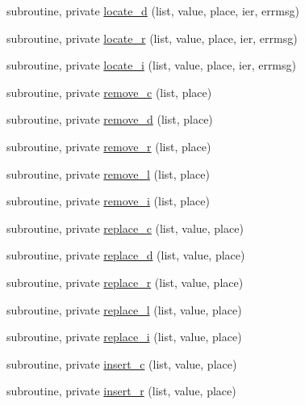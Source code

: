 \begin{DoxyCompactItemize}
\item 
subroutine, private \mbox{\hyperlink{namespacem__cli_a4187c24a2abf5cc630232965637493e8}{locate\+\_\+d}} (list, value, place, ier, errmsg)
\item 
subroutine, private \mbox{\hyperlink{namespacem__cli_ac44389e115b536069f324bffea7d2469}{locate\+\_\+r}} (list, value, place, ier, errmsg)
\item 
subroutine, private \mbox{\hyperlink{namespacem__cli_a36665ab0ea5080c14c8c9e52ed07d397}{locate\+\_\+i}} (list, value, place, ier, errmsg)
\item 
subroutine, private \mbox{\hyperlink{namespacem__cli_a05f549b10f50798d68003b8fd2a2d86a}{remove\+\_\+c}} (list, place)
\item 
subroutine, private \mbox{\hyperlink{namespacem__cli_abf22cbc2af66482f33b7bb1a210d9d99}{remove\+\_\+d}} (list, place)
\item 
subroutine, private \mbox{\hyperlink{namespacem__cli_a4f47701695b95c88fa4927c04996ce0f}{remove\+\_\+r}} (list, place)
\item 
subroutine, private \mbox{\hyperlink{namespacem__cli_a9c86f0f52ce71f14e774fd21f0686cf6}{remove\+\_\+l}} (list, place)
\item 
subroutine, private \mbox{\hyperlink{namespacem__cli_afa08d3d87184a6dd68a124231e536c93}{remove\+\_\+i}} (list, place)
\item 
subroutine, private \mbox{\hyperlink{namespacem__cli_a785aa0016768b6dc2e27c29d5342c329}{replace\+\_\+c}} (list, value, place)
\item 
subroutine, private \mbox{\hyperlink{namespacem__cli_aa9b7d672cc9fb0bc79fd09a2870614f5}{replace\+\_\+d}} (list, value, place)
\item 
subroutine, private \mbox{\hyperlink{namespacem__cli_ab3b33abc8a6da174d3f27c2f2203038c}{replace\+\_\+r}} (list, value, place)
\item 
subroutine, private \mbox{\hyperlink{namespacem__cli_a89ed5c3b944f91d8135173206fbc7e07}{replace\+\_\+l}} (list, value, place)
\item 
subroutine, private \mbox{\hyperlink{namespacem__cli_ac609c48bb1f904235b8cbf8bea61473f}{replace\+\_\+i}} (list, value, place)
\item 
subroutine, private \mbox{\hyperlink{namespacem__cli_a9baf1cf0e20942fbde8c025ead5a30db}{insert\+\_\+c}} (list, value, place)
\item 
subroutine, private \mbox{\hyperlink{namespacem__cli_a4bfb90e14824f94017b1d4fcb39f0701}{insert\+\_\+r}} (list, value, place)
\item 

\end{DoxyCompactItemize}
